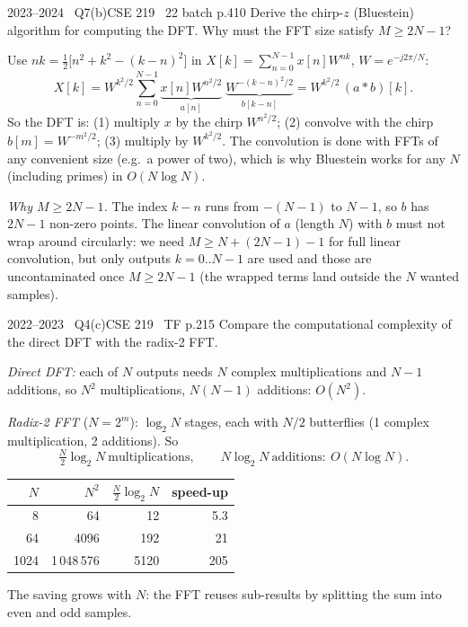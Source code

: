 \begin{qcard}{2023--2024 \textbullet\ Q7(b)}{CSE 219 \textbullet\ 22 batch p.4}{10}
Derive the chirp-$z$ (Bluestein) algorithm for computing the DFT. Why must the FFT size satisfy $M\ge2N-1$?
\end{qcard}
\begin{solution}
Use $nk=\tfrac12\big[n^2+k^2-(k-n)^2\big]$ in $X[k]=\sum_{n=0}^{N-1}x[n]W^{nk}$, $W=e^{-j2\pi/N}$:
\[X[k]=W^{k^2/2}\sum_{n=0}^{N-1}\underbrace{x[n]W^{n^2/2}}_{a[n]}\;\underbrace{W^{-(k-n)^2/2}}_{b[k-n]}=W^{k^2/2}\,(a*b)[k].\]
So the DFT is: (1) multiply $x$ by the chirp $W^{n^2/2}$; (2) convolve with the chirp $b[m]=W^{-m^2/2}$; (3) multiply by $W^{k^2/2}$. The convolution is done with FFTs of any convenient size (e.g.\ a power of two), which is why Bluestein works for any $N$ (including primes) in $O(N\log N)$.

\emph{Why $M\ge2N-1$.} The index $k-n$ runs from $-(N-1)$ to $N-1$, so $b$ has $2N-1$ non-zero points. The linear convolution of $a$ (length $N$) with $b$ must not wrap around circularly: we need $M\ge N+(2N-1)-1$ for full linear convolution, but only outputs $k=0..N-1$ are used and those are uncontaminated once $M\ge2N-1$ (the wrapped terms land outside the $N$ wanted samples).
\end{solution}

\begin{qcard}{2022--2023 \textbullet\ Q4(c)}{CSE 219 \textbullet\ TF p.2}{15}
Compare the computational complexity of the direct DFT with the radix-2 FFT.
\end{qcard}
\begin{solution}
\emph{Direct DFT:} each of $N$ outputs needs $N$ complex multiplications and $N-1$ additions, so $N^2$ multiplications, $N(N-1)$ additions: $O(N^2)$.

\emph{Radix-2 FFT} ($N=2^m$): $\log_2N$ stages, each with $N/2$ butterflies (1 complex multiplication, 2 additions). So
\[\tfrac N2\log_2N\ \text{multiplications},\qquad N\log_2N\ \text{additions}:\ O(N\log N).\]
\begin{center}\small\begin{tabular}{@{}rrrr@{}}\toprule$N$&$N^2$&$\frac N2\log_2N$&speed-up\\\midrule8&64&12&5.3\\64&4096&192&21\\1024&1\,048\,576&5120&205\\\bottomrule\end{tabular}\end{center}
The saving grows with $N$: the FFT reuses sub-results by splitting the sum into even and odd samples.
\end{solution}

